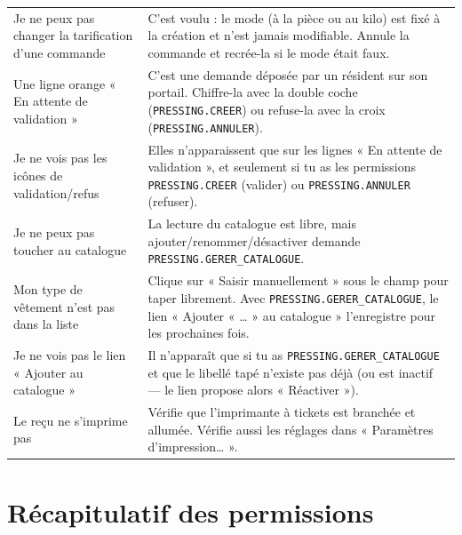 \documentclass[12pt,a4paper]{article}
\begin{document}
\begin{longtable}{>{\raggedright}p{5cm} p{9cm}}
Je ne peux pas changer la tarification d'une commande & C'est voulu : le mode (à la pièce ou au kilo) est fixé à la création et n'est jamais modifiable. Annule la commande et recrée-la si le mode était faux. \\

Une ligne orange « En attente de validation » & C'est une demande déposée par un résident sur son portail. Chiffre-la avec la double coche (\texttt{PRESSING.CREER}) ou refuse-la avec la croix (\texttt{PRESSING.ANNULER}). \\

Je ne vois pas les icônes de validation/refus & Elles n'apparaissent que sur les lignes « En attente de validation », et seulement si tu as les permissions \texttt{PRESSING.CREER} (valider) ou \texttt{PRESSING.ANNULER} (refuser). \\

Je ne peux pas toucher au catalogue & La lecture du catalogue est libre, mais ajouter/renommer/désactiver demande \texttt{PRESSING.GERER\_CATALOGUE}. \\

Mon type de vêtement n'est pas dans la liste & Clique sur « Saisir manuellement » sous le champ pour taper librement. Avec \texttt{PRESSING.GERER\_CATALOGUE}, le lien « Ajouter « … » au catalogue » l'enregistre pour les prochaines fois. \\

Je ne vois pas le lien « Ajouter au catalogue » & Il n'apparaît que si tu as \texttt{PRESSING.GERER\_CATALOGUE} et que le libellé tapé n'existe pas déjà (ou est inactif — le lien propose alors « Réactiver »). \\

Le reçu ne s'imprime pas & Vérifie que l'imprimante à tickets est branchée et allumée. Vérifie aussi les réglages dans « Paramètres d'impression… ». \\

\bottomrule
\end{longtable}

\newpage

\section{Récapitulatif des permissions}
\end{document}

